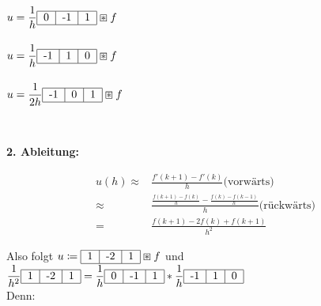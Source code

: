 \documentclass[ngerman]{article}
\theoremstyle{plain}
\theoremstyle{definition}
\numberwithin{equation}{section}
\newcommand{\mtitle}[1] {
    \begin{center}
        \large{\textbf{#1}}
    \end{center}
}
\begin{document}
    \begin{minipage}[c]{0.3\linewidth}
        \ \\
        $u=\displaystyle \frac{1}{h}\begin{tabular}{|c|c|c|}
            \hline
            0 & -1 & 1\\
            \hline
        \end{tabular} \boxast f$\\
        \ \\
        $u=\displaystyle \frac{1}{h}\begin{tabular}{|c|c|c|}
            \hline
            -1 & 1 & 0\\
            \hline
        \end{tabular} \boxast f$\\
        \ \\
        $u=\displaystyle \frac{1}{2h}\begin{tabular}{|c|c|c|}
            \hline
            -1 & 0 & 1\\
            \hline
            \end{tabular} \boxast f$\\
    \end{minipage}
    \ \\

    \mtitle{2. Ableitung:}

    \begin{align*}
        u(h) \approx & \frac{f'(k+1) - f'(k)}{h} \text{(vorwärts)}\\
        \approx & \frac{\frac{f(k+1) - f(k)}{h} - \frac{f(k) - f(k-1)}{h}}{h} \text{(rückwärts)} \\
        = & \frac{f(k+1) -2 f(k) + f(k+1)}{h^2}
    \end{align*}

    Also folgt $\displaystyle u \coloneqq \begin{tabular}{|c|c|c|}
        \hline
        1 & -2 & 1\\
        \hline
        \end{tabular} \boxast f$ und $\displaystyle \frac{1}{h^2}\begin{tabular}{|c|c|c|}
            \hline
            1 & -2 & 1\\
            \hline
            \end{tabular} = \frac{1}{h}\begin{tabular}{|c|c|c|}
                \hline
                0 & -1 & 1\\
                \hline
                \end{tabular} * \frac{1}{h}\begin{tabular}{|c|c|c|}
                    \hline
                    -1 & 1 & 0\\
                    \hline
                    \end{tabular}$\\
    Denn:
\end{document}
